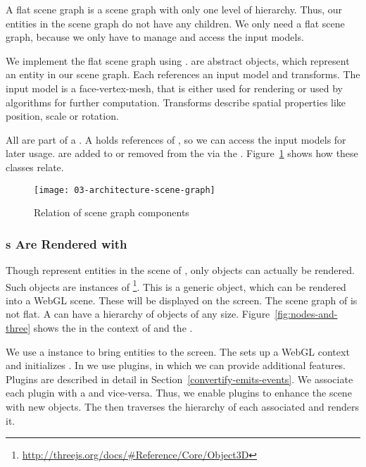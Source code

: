 \documentclass[../03-Architecture.tex]{subfiles}
\begin{document}
A flat scene graph is a scene graph with only one level of
hierarchy. Thus, our entities in the scene graph do not have
any children. We only need a flat scene graph, because we
only have to manage and access the input models.

We implement the flat scene graph using .
 are abstract objects, which represent an
entity in our scene graph. Each  references an
input model and transforms. The input model is a
face-vertex-mesh, that is either used for rendering or used
by algorithms for further computation. Transforms
describe spatial properties like position, scale or
rotation.

All  are part of a . A
 holds references of , so we can
access the input models for later usage.  are
added to or removed from the  via the
. Figure~\ref{fig:scene-graph} shows how
these classes relate.

\begin{figure}[h]
  \centering
  \texttt{[image: 03-architecture-scene-graph]}
  \caption{Relation of scene graph components}
  \label{fig:scene-graph}
\end{figure}

\subsubsection{{\threedobject}s Are Rendered with
  {\threejs}}

Though  represent entities in the scene of
{\convertify}, only {\threejs} objects can actually be
rendered. Such {\threejs} objects are instances of
\footnote{\url{http://threejs.org/docs/#Reference/Core/Object3D}}.
This is a generic object, which can be rendered into a WebGL
scene. These  will be displayed on the
screen. The scene graph of {\threejs} is not flat. A
 can have a hierarchy of objects of
any size. Figure~\ref{fig:nodes-and-three} shows the
 in the context of  and
the .

We use a  instance to bring {\threejs} entities to the
screen. The  sets up a WebGL context and initializes
{\threejs}. In {\convertify} we use plugins, in which we can provide
additional features. Plugins are described in detail in
Section~\ref{convertify-emits-events}. We associate each plugin with a
 and vice-versa. Thus, we enable plugins to
enhance the scene with new objects. The  then
traverses the hierarchy of each associated  and
renders it.
\end{document}
